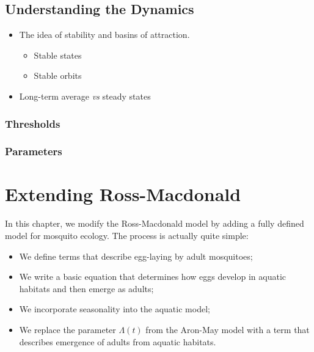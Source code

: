 \documentclass[
]{book}
\begin{document}
\clearpage

\hypertarget{understanding-the-dynamics}{%
\section{Understanding the Dynamics}\label{understanding-the-dynamics}}

\begin{itemize}
\item
  The idea of stability and basins of attraction.

  \begin{itemize}
  \item
    Stable states
  \item
    Stable orbits
  \end{itemize}
\item
  Long-term average \emph{vs} steady states
\end{itemize}

\hypertarget{thresholds}{%
\subsection{Thresholds}\label{thresholds}}

\hypertarget{parameters}{%
\subsection{Parameters}\label{parameters}}

\hypertarget{extending-ross-macdonald}{%
\chapter{Extending Ross-Macdonald}\label{extending-ross-macdonald}}

In this chapter, we modify the Ross-Macdonald model by adding a
fully defined model for mosquito ecology. The process is actually
quite simple:

\begin{itemize}
\item
  We define terms that describe egg-laying by adult mosquitoes;
\item
  We write a basic equation that determines how eggs develop in
  aquatic habitats and then emerge as adults;
\item
  We incorporate seasonality into the aquatic model;
\item
  We replace the parameter \(\Lambda(t)\) from the Aron-May model with a term that
  describes emergence of adults from aquatic habitats.
\end{itemize}
\end{document}
